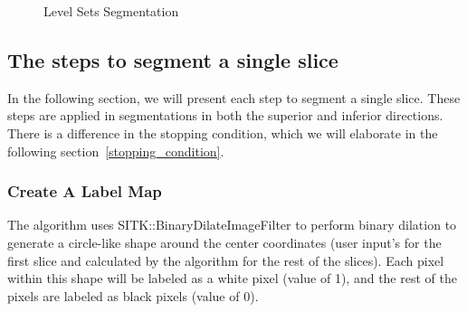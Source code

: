 \begin{figure}[H] 
\centering
{}%
%
%
\caption[Level Sets Segmentation]{Level Sets Segmentation}
\label{LSS}
\end{figure}

\subsection{The steps to segment a single slice}
In the following section, we will present each step to segment a single slice. These steps are applied in segmentations in both the superior and inferior directions. There is a difference in the stopping condition, which we will elaborate in the following section~\ref{stopping_condition}.
\subsubsection{Create A Label Map}\label{label_map}
The algorithm uses SITK::BinaryDilateImageFilter to perform binary dilation to generate a circle-like shape around the center coordinates (user input’s for the first slice and calculated by the algorithm for the rest of the slices). Each pixel within this shape will be labeled as a white pixel (value of 1), and the rest of the pixels are labeled as black pixels (value of 0). 

